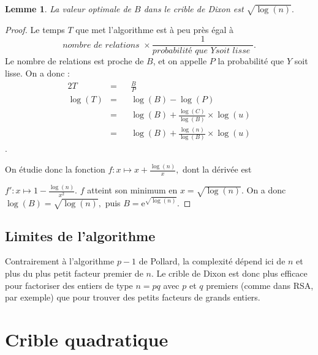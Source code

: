 \documentclass[french, 12pt, titlepage]{article}
\newtheorem{lemme}{Lemme}
\begin{document}
\begin{lemme}
La valeur optimale de $B$ dans le crible de Dixon est $\sqrt{\log(n)}.$
\end{lemme}

\begin{proof}

Le temps $T$ que met l'algorithme est à peu près égal à
\[\textit{nombre de relations } \times \frac{1}{\textit{probabilité que
  } Y \textit{soit lisse }}.\] Le nombre de relations est proche de $B$, et on
appelle $P$ la probabilité que $Y$ soit lisse. On a donc : 
\begin{alignat*}{2}
T & = && \frac{B}{P} \\
\log(T) & = && \log(B) - \log(P) \\
 & = && \log(B) + \frac{\log(C)}{\log(B)} \times \log(u) \\
 & = && \log(B) + \frac{\log(n)}{\log(B)} \times \log(u)
\end{alignat*}.     

On étudie donc la fonction $f : x \mapsto x + \frac{\log(n)}{x},$ dont
la dérivée est 

\noindent $f' : x \mapsto 1 - \frac{\log(n)}{x^2}.$ $f$ atteint
son minimum en $x = \sqrt{\log(n)}.$ On a donc $\log(B) =
\sqrt{\log(n)},$ puis $B = \text{e}^{\sqrt{\log(n)}}.$

\end{proof}

\subsection{Limites de l'algorithme}

Contrairement à l'algorithme $p - 1$ de Pollard, la complexité dépend
ici de $n$ et plus du plus petit facteur premier de $n.$ Le crible de
Dixon est donc plus efficace pour factoriser des entiers de type $n =
pq$ avec $p$ et $q$ premiers (comme dans RSA, par exemple) que pour trouver des petits facteurs de
grands entiers.

\section{Crible quadratique}
\end{document}
